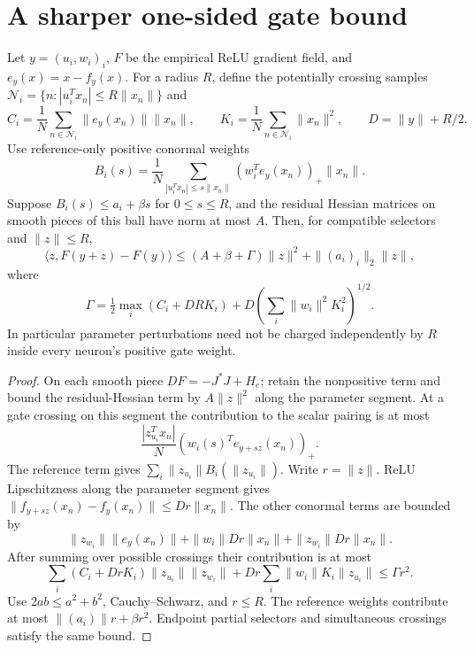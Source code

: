 \section{A sharper one-sided gate bound}
Let $y=(u_i,w_i)_i$, $F$ be the empirical ReLU gradient field, and
$e_y(x)=x-f_y(x)$. For a radius $R$, define the potentially crossing samples
$\mathcal N_i=\{n:|u_i^Tx_n|\le R\|x_n\|\}$ and
\[
 C_i=\frac1N\sum_{n\in\mathcal N_i}\|e_y(x_n)\|\|x_n\|,
 \qquad K_i=\frac1N\sum_{n\in\mathcal N_i}\|x_n\|^2,
 \qquad D=\|y\|+R/2.
\]
Use reference-only positive conormal weights
\[
 B_i(s)=\frac1N\sum_{|u_i^Tx_n|\le s\|x_n\|}
                 (w_i^Te_y(x_n))_+\|x_n\|.
\]
Suppose $B_i(s)\le a_i+\beta s$ for $0\le s\le R$, and the residual
Hessian matrices on smooth pieces of this ball have norm at most $A$.
Then, for compatible selectors and $\|z\|\le R$,
\begin{equation}\label{eq:sharp-gate-stability}
 \langle z,F(y+z)-F(y)\rangle
 \le (A+\beta+\Gamma)\|z\|^2+\|(a_i)_i\|_2\|z\|,
\end{equation}
where
\[
 \Gamma=\tfrac12\max_i(C_i+DRK_i)
       +D\left(\sum_i\|w_i\|^2K_i^2\right)^{1/2}.
\]
In particular parameter perturbations need not be charged independently by
$R$ inside every neuron's positive gate weight.

\begin{proof}
On each smooth piece $DF=-J^*J+H_e$; retain the nonpositive term and bound
the residual-Hessian term by $A\|z\|^2$ along the parameter segment.
At a gate crossing on this segment the contribution to the scalar pairing
is at most
\[
 \frac{|z_{u_i}^Tx_n|}{N}
                 (w_i(s)^Te_{y+sz}(x_n))_+.
\]
The reference term gives $\sum_i\|z_{u_i}\|B_i(\|z_{u_i}\|)$.
Write $r=\|z\|$. ReLU Lipschitzness along the parameter segment gives
$\|f_{y+sz}(x_n)-f_y(x_n)\|\le Dr\|x_n\|$.
The other conormal terms are bounded by
\[
 \|z_{w_i}\|\|e_y(x_n)\|
 +\|w_i\|Dr\|x_n\|+\|z_{w_i}\|Dr\|x_n\|.
\]
After summing over possible crossings their contribution is at most
\[
 \sum_i(C_i+DrK_i)\|z_{u_i}\|\|z_{w_i}\|
 +Dr\sum_i\|w_i\|K_i\|z_{u_i}\|
 \le\Gamma r^2.
\]
Use $2ab\le a^2+b^2$, Cauchy--Schwarz, and $r\le R$.
The reference weights contribute at most $\|(a_i)\|r+\beta r^2$.
Endpoint partial selectors and simultaneous crossings satisfy the same bound.
\end{proof}

